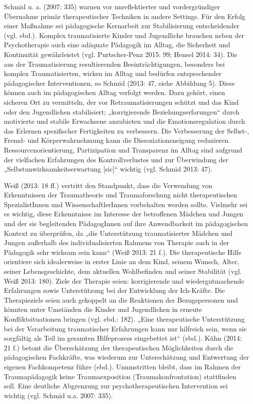 Schmid u. a. (2007: 335) warnen vor unreflektierter und vordergründiger Übernahme prim{\"a}r therapeutischer Techniken in andere Settings. F{\"u}r den Erfolg einer Maßnahme sei p{\"a}dagogische Kernarbeit zur Stabilisierung entscheidender (vgl. ebd.). Komplex traumatisierte Kinder und Jugendliche brauchen neben der Psychotherapie auch eine adäquate Pädagogik im Alltag, die Sicherheit und Kontinuität gewährleistet (vgl. Purtscher-Penz 2015: 99; Hensel 2014: 34). Die aus der Traumatisierung resultierenden Beeinträchtigungen, besonders bei komplex Traumatisierten, wirken im Alltag und bedürfen entsprechender pädagogischer Interventionen, so Schmid (2013: 47, siehe Abbildung 5). Diese können auch im pädagogischen Alltag verfolgt werden. Dazu gehört, einen sicheren Ort zu vermitteln, der vor Retraumatisierungen schützt und das Kind oder den Jugendlichen stabilisiert; „korrigierende Beziehungserfarungen“ durch motivierte und stabile Erwachsene anzubieten und die Emotionsregulation durch das Erlernen spezifischer Fertigkeiten zu verbessern. Die Verbesserung der Selbst-, Fremd- und Körperwahrnehmung kann die Dissoziationsneigung reduzieren. Ressourcenorientierung, Partizipation und Transparenz im Alltag sind aufgrund der vielfachen Erfahrungen des Kontrollverlustes und zur Überwindung der „Selbstunwirksamkeitserwartung [sic]“ wichtig (vgl. Schmid 2013: 47).

Weiß (2013: 18 ff.) vertritt den Standpunkt, dass die Verwendung von Erkenntnissen der Traumatheorie und Traumaforschung nicht therapeutischen SpezialistInnen und WissenschaftlerInnen vorbehalten werden sollte. Vielmehr sei es wichtig, diese Erkenntnisse im Interesse der betroffenen M{\"a}dchen und Jungen und der sie begleitenden P{\"a}dagogInnen auf ihre Anwendbarkeit im pädagogischen Kontext zu {\"u}berpr{\"u}fen, da „die Unterst{\"u}tzung traumatisierter M{\"a}dchen und Jungen außerhalb des individualisierten Rahmens von Therapie auch in der P{\"a}dagogik sehr wirksam sein kann“ (Weiß 2013: 21 f.). Die therapeutische Hilfe orientiere sich idealerweise in erster Linie an dem Kind, seinem Wunsch, Alter, seiner Lebensgeschichte, dem aktuellen Wohlbefinden und seiner Stabilität (vgl. Weiß 2013: 180). Ziele der Therapie seien: korrigierende und wiedergutmachende Erfahrungen sowie Unterstützung bei der Entwicklung der Ich-Kräfte. Die Therapieziele seien auch gekoppelt an die Reaktionen der Bezugspersonen und könnten unter Umständen die Kinder und Jugendlichen in erneute Konfliktsituationen bringen (vgl. ebd.: 182). „Eine therapeutische Unterstützung bei der Verarbeitung traumatischer Erfahrungen kann nur hilfreich sein, wenn sie sorgfältig als Teil im gesamten Hilfeprozess eingebettet ist“ (ebd.). Kühn (2014: 21 f.) betont die Überschätzung der therapeutischen Möglichkeiten durch die pädagogischen Fachkräfte, was wiederum zur Unterschätzung und Entwertung der eigenen Fachkompetenz führe (ebd.). Unumstritten bleibt, dass im Rahmen der Traumap{\"a}dagogik keine Traumaexposition (Traumakonfrontation) stattfinden soll. Eine deutliche Abgrenzung zur psychotherapeutischen Intervention sei wichtig (vgl. Schmid u.a. 2007: 335).

